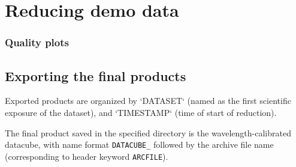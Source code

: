 
\section{Reducing demo data}
\label{sec:reducing_demo_data}



 
\subsubsection{Quality plots}


\subsection{Exporting the final products}
\label{sec:export_final_products}




 
Exported products are organized by `DATASET` (named as the first scientific exposure of the dataset), and `TIMESTAMP` (time of start of reduction). 

The final product saved in the specified directory is the wavelength-calibrated datacube, with name format \texttt{DATACUBE\_} followed by the archive file name (corresponding to header keyword \texttt{ARCFILE}).